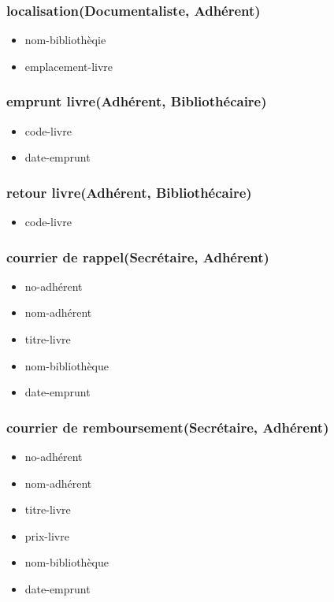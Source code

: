 \subsubsection*{localisation(Documentaliste, Adhérent)}
\begin{itemize}
    \item nom-bibliothèqie
    \item emplacement-livre
\end{itemize}

\subsubsection*{emprunt livre(Adhérent, Bibliothécaire)}
\begin{itemize}
    \item code-livre
    \item date-emprunt
\end{itemize}

\subsubsection*{retour livre(Adhérent, Bibliothécaire)}
\begin{itemize}
    \item code-livre
\end{itemize}

\subsubsection*{courrier de rappel(Secrétaire, Adhérent)}
\begin{itemize}
    \item no-adhérent
    \item nom-adhérent
    \item titre-livre
    \item nom-bibliothèque
    \item date-emprunt
\end{itemize}

\subsubsection*{courrier de remboursement(Secrétaire, Adhérent)}
\begin{itemize}
    \item no-adhérent
    \item nom-adhérent
    \item titre-livre
    \item prix-livre
    \item nom-bibliothèque
    \item date-emprunt
\end{itemize}

